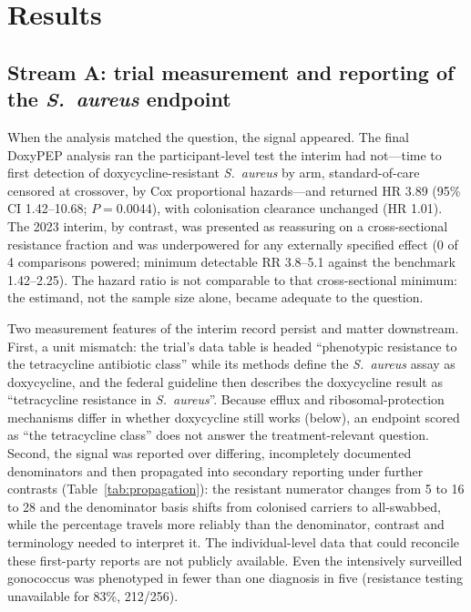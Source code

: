 \documentclass[12pt,a4paper]{article}
\newcommand{\sa}{\emph{S.~aureus}}
\begin{document}
\section*{Results}

\subsection*{Stream A: trial measurement and reporting of the \sa{} endpoint}
When the analysis matched the question, the signal appeared. The final DoxyPEP
analysis ran the participant-level test the interim had not---time to first
detection of doxycycline-resistant \sa{} by arm, standard-of-care censored at
crossover, by Cox proportional hazards---and returned HR 3.89 (95\% CI
1.42--10.68; $P=0.0044$), with colonisation clearance unchanged (HR
1.01).\cite{luetkemeyer2025} The 2023 interim, by contrast, was presented as reassuring
on a cross-sectional resistance fraction and was underpowered for any externally
specified effect (0 of 4 comparisons powered; minimum detectable RR 3.8--5.1
against the benchmark 1.42--2.25). The hazard ratio is not comparable to that
cross-sectional minimum: the estimand, not the sample size alone, became adequate
to the question.

Two measurement features of the interim record persist and matter downstream.
First, a unit mismatch: the trial's data table is headed ``phenotypic resistance
to the tetracycline antibiotic class'' while its methods define the \sa{} assay
as doxycycline, and the federal guideline then describes the doxycycline result
as ``tetracycline resistance in \sa{}''.\cite{cdc2024doxypep} Because efflux and
ribosomal-protection mechanisms differ in whether doxycycline still works
(below), an endpoint scored as ``the tetracycline class'' does not answer the
treatment-relevant question. Second, the signal was reported over differing,
incompletely documented denominators and then propagated into secondary reporting
under further contrasts (Table~\ref{tab:propagation}): the resistant numerator
changes from 5 to 16 to 28 and the denominator basis shifts from colonised
carriers to all-swabbed, while the percentage travels more reliably than the
denominator, contrast and terminology needed to interpret it. The individual-level
data that could reconcile these first-party reports are not publicly
available.\cite{luetkemeyer2023} Even the intensively surveilled gonococcus was
phenotyped in fewer than one diagnosis in five (resistance testing unavailable for
83\%, 212/256).\cite{luetkemeyer2023croi}
\end{document}

